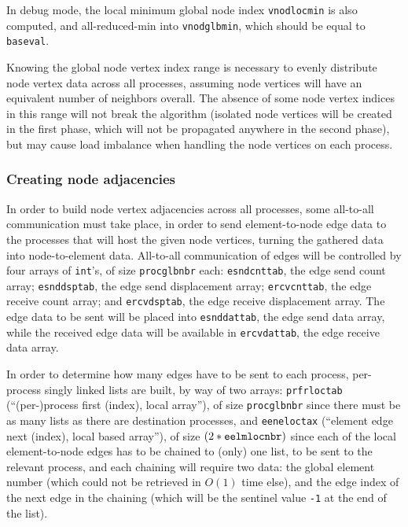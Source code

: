 In debug mode, the local minimum global node index \texttt{vnodlocmin} is
also computed, and all-reduced-min into \texttt{vnodglbmin}, which
should be equal to \texttt{baseval}.

Knowing the global node vertex index range is necessary to evenly
distribute node vertex data across all processes, assuming node
vertices will have an equivalent number of neighbors overall. The
absence of some node vertex indices in this range will not break the
algorithm (isolated node vertices will be created in the first phase,
which will not be propagated anywhere in the second phase), but may
cause load imbalance when handling the node vertices on each process.

\subsubsection{Creating node adjacencies}

In order to build node vertex adjacencies across all processes, some
all-to-all communication must take place, in order to send
element-to-node edge data to the processes that will host the given
node vertices, turning the gathered data into node-to-element
data. All-to-all communication of edges will be controlled by four
arrays of \texttt{int}'s, of size \texttt{procglbnbr} each:
\texttt{esnd\lbt cnt\lbt tab}, the edge send count array;
\texttt{esnd\lbt dsp\lbt tab}, the edge send displacement array;
\texttt{ercv\lbt cnt\lbt tab}, the edge receive count array; and
\texttt{ercv\lbt dsp\lbt tab}, the edge receive displacement array.
The edge data to be sent will be placed into \texttt{esnddattab}, the
edge send data array, while the received edge data will be available
in \texttt{ercvdattab}, the edge receive data array.

In order to determine how many edges have to be sent to each process,
per-process singly linked lists are built, by way of two arrays:
\texttt{prfr\lbt loc\lbt tab} (``\mbox{(per-)}process first (index),
local array''), of size \texttt{proc\lbt glb\lbt nbr} since there must
be as many lists as there are destination processes, and
\texttt{eene\lbt loc\lbt tax} (``element edge next (index), local
based array''), of size $(2 * \texttt{eelm\lbt loc\lbt nbr})$ since
each of the local element-to-node edges has to be chained to (only)
one list, to be sent to the relevant process, and each chaining will
require two data: the global element number (which could not be
retrieved in $O(1)$ time else), and the edge index of the next edge in
the chaining (which will be the sentinel value \texttt{-1} at the end
of the list).


